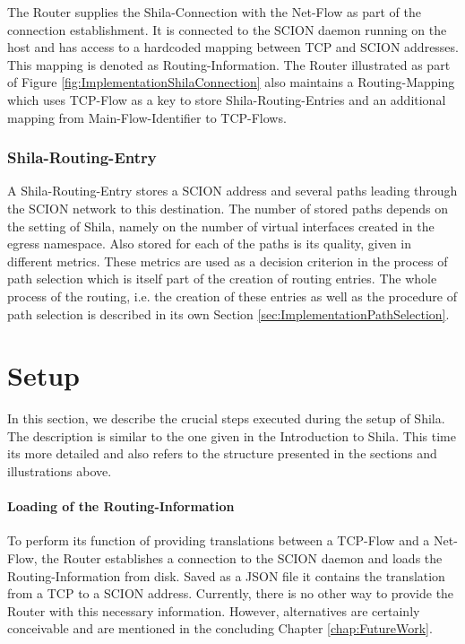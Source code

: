 The Router supplies the Shila-Connection with the Net-Flow as part of the connection establishment. It is connected to the SCION daemon running on the host and has access to a hardcoded mapping between TCP and SCION addresses. This mapping is denoted as Routing-Information. The Router illustrated as part of Figure \ref{fig:ImplementationShilaConnection} also maintains a Routing-Mapping which uses TCP-Flow as a key to store Shila-Routing-Entries and an additional mapping from Main-Flow-Identifier to TCP-Flows.

\subsubsection{Shila-Routing-Entry}

A Shila-Routing-Entry stores a SCION address and several paths leading through the SCION network to this destination. The number of stored paths depends on the setting of Shila, namely on the number of virtual interfaces created in the egress namespace. Also stored for each of the paths is its quality, given in different metrics. These metrics are used as a decision criterion in the process of path selection which is itself part of the creation of routing entries. The whole process of the routing, i.e. the creation of these entries as well as the procedure of path selection is described in its own Section \ref{sec:ImplementationPathSelection}.

\newpage
\section{Setup}
\label{sec:ImplementationSetup}

In this section, we describe the crucial steps executed during the setup of Shila. The description is similar to the one given in the Introduction to Shila. This time its more detailed and also refers to the structure presented in the sections and illustrations above.

\paragraph{Loading of the Routing-Information}

To perform its function of providing translations between a TCP-Flow and a Net-Flow, the Router establishes a connection to the SCION daemon and loads the Routing-Information from disk. Saved as a JSON file it contains the translation from a TCP to a SCION address. Currently, there is no other way to provide the Router with this necessary information. However, alternatives are certainly conceivable and are mentioned in the concluding Chapter \ref{chap:FutureWork}.

